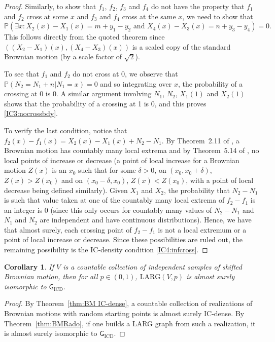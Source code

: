\documentclass{daj}
\newtheorem{cor}[thm]{Corollary}
\newcommand{\LARG}{\mathrm{LARG}}
\newcommand{\PP}{\mathbb P}
\begin{document}
\begin{proof}
Similarly, to show that $f_1$, $f_2$, $f_3$ and $f_4$ do not have the
property that $f_1$ and $f_2$ cross at some $x$ and $f_3$ and $f_4$
cross at the same $x$, we need to show that
$$
\PP(\exists x\colon X_2(x)-X_1(x)=m+y_1-y_2\text{ and }
X_4(x)-X_3(x)=n+y_3-y_4)=0.
$$
This follows directly from the quoted theorem since $((X_2-X_1)(x),
(X_4-X_3)(x))$ is a scaled copy of the standard Brownian motion (by a scale
factor of $\sqrt 2$).

To see that $f_1$ and $f_2$ do not cross at 0, we observe that
$\PP(N_2=N_1+n|N_1=x)=0$ and so integrating over $x$, the
probability of a crossing at 0 is 0. A similar argument involving
$N_1$, $N_2$, $X_1(1)$ and $X_2(1)$ shows that the probability
of a crossing at 1 is 0, and this proves \ref{IC3:nocrossbdy}.

To verify the last condition, notice that $f_2(x)-f_1(x)=X_2(x)-X_1(x)+N_2-N_1$.
By Theorem~2.11 of \cite{MortersPeres}, a Brownian
motion has countably many local extrema and by Theorem~5.14 of \cite{MortersPeres},
no local points of increase or decrease (a point of local increase for a Brownian motion
$Z(x)$ is an $x_0$ such that for some $\delta>0$,
on $(x_0,x_0+\delta)$, $Z(x)>Z(x_0)$ and
on $(x_0-\delta,x_0)$, $Z(x)<Z(x_0)$, with a point of local decrease being
defined similarly).
Given $X_1$ and $X_2$, the
probability that $N_2-N_1$ is such that value taken at one of the countably many local
extrema of $f_2-f_1$ is an integer is 0 (since this only occurs
for countably many values of $N_2-N_1$ and $N_1$ and $N_2$ are independent and have
continuous distributions). Hence, we have that almost surely, each crossing
point of $f_2-f_1$ is not a local extremum or a point of local increase or decrease.
Since these possibilities are ruled out, the remaining possibility is
the IC-density condition \ref{IC4:infcross}.
\end{proof}

\begin{cor}\label{cor:RadoBM}
If $V$ is a countable collection of independent samples of shifted Brownian motion,
then for all $p\in (0,1)$, $\LARG(V,p)$ is almost surely isomorphic to
$\mathsf G_\text{ICD}$.
\end{cor}

\begin{proof}
By Theorem~\ref{thm:BM IC-dense}, a countable collection of realizations of Brownian
motions with random starting points is almost surely IC-dense. By Theorem~\ref{thm:BMRado},
if one builds a LARG graph from such a realization, it is almost surely isomorphic to
$\mathsf G_\text{ICD}$.
\end{proof}
\end{document}
